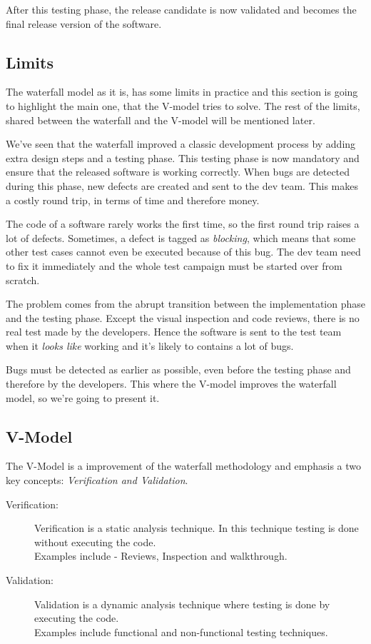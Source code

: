 After this testing phase, the release candidate is now validated and becomes
the final release version of the software.

\subsection{Limits}\label{subsec:limits}
The waterfall model as it is, has some limits in practice and this section is
going to highlight the main one, that the V-model tries to solve.
The rest of the limits, shared between the waterfall and the V-model will be
mentioned later.

We've seen that the waterfall improved a classic development process by
adding extra design steps and a testing phase.
This testing phase is now mandatory and ensure that the released software is
working correctly.
When bugs are detected during this phase, new defects are created and sent to
the dev team.
This makes a costly round trip, in terms of time and therefore money.

The code of a software rarely works the first time, so the first round trip
raises a lot of defects.
Sometimes, a defect is tagged as \textit{blocking}, which means that some other
test cases cannot even be executed because of this bug.
The dev team need to fix it immediately and the whole test campaign must be
started over from scratch.

The problem comes from the abrupt transition between the implementation phase
and the testing phase.
Except the visual inspection and code reviews, there is no real test made by
the developers.
Hence the software is sent to the test team when it \textit{looks like}
working and it's likely to contains a lot of bugs.

Bugs must be detected as earlier as possible, even before the
testing phase and therefore by the developers.
This where the V-model improves the waterfall model, so we're going to
present it.

\subsection{V-Model}\label{subsec:v-model}
The V-Model is a improvement of the waterfall methodology and emphasis a
two key concepts: \textit{Verification and Validation}.
\begin{description}
    \item[Verification:] Verification is a static analysis technique.
    In this technique testing is done without executing the code. \\
    Examples include - Reviews, Inspection and walkthrough.
    \item[Validation:] Validation is a dynamic analysis technique where
    testing is done by executing the code. \\
    Examples include functional and non-functional testing techniques.
\end{description}

